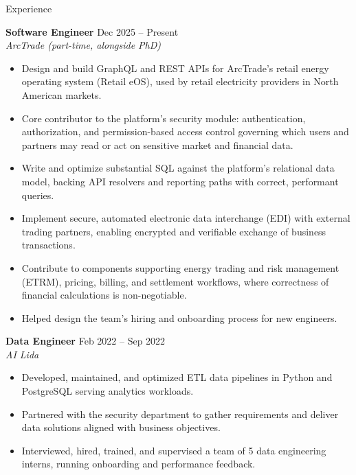 \documentclass{resume}
\newenvironment{rItems}{%
  \begin{itemize}[leftmargin=1.1em, itemsep=0.05em, topsep=0.15em, parsep=0em, label=$\cdot$]%
}{\end{itemize}\vspace{0.2em}}
\begin{document}
\begin{rSection}{Experience}

{\bf Software Engineer} \hfill {Dec 2025 -- Present} \\
{\em ArcTrade (part-time, alongside PhD)}
\begin{rItems}
  \item Design and build GraphQL and REST APIs for ArcTrade's retail energy operating system (Retail eOS), used by retail electricity providers in North American markets.
  \item Core contributor to the platform's security module: authentication, authorization, and permission-based access control governing which users and partners may read or act on sensitive market and financial data.
  \item Write and optimize substantial SQL against the platform's relational data model, backing API resolvers and reporting paths with correct, performant queries.
  \item Implement secure, automated electronic data interchange (EDI) with external trading partners, enabling encrypted and verifiable exchange of business transactions.
  \item Contribute to components supporting energy trading and risk management (ETRM), pricing, billing, and settlement workflows, where correctness of financial calculations is non-negotiable.
  \item Helped design the team's hiring and onboarding process for new engineers.
\end{rItems}

{\bf Data Engineer} \hfill {Feb 2022 -- Sep 2022} \\
{\em AI Lida}
\begin{rItems}
  \item Developed, maintained, and optimized ETL data pipelines in Python and PostgreSQL serving analytics workloads.
  \item Partnered with the security department to gather requirements and deliver data solutions aligned with business objectives.
  \item Interviewed, hired, trained, and supervised a team of 5 data engineering interns, running onboarding and performance feedback.
\end{rItems}

\end{rSection}
\end{document}
